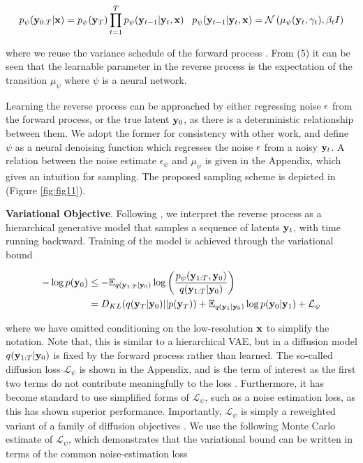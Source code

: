 \begin{equation}
p_{\psi}(\bold{y}_{0:T}\lvert\bold{x}) = p_{\psi}(\bold{y}_{T})\prod_{t=1}^{T} p_{\psi}(\bold{y}_{t-1}\lvert\bold{y}_{t},\bold{x}) \;\;\; p_{\psi}(\bold{y}_{t-1}\lvert\bold{y}_{t},\bold{x}) = \mathcal{N}\left(\mu_{\psi}(\bold{y}_{t},\gamma_{t}),\beta_{t}I\right)
\end{equation}

where we reuse the variance schedule of the forward process \parencite{Ho2020}. From (5) it can be seen that the learnable parameter in the reverse process is the expectation of the transition $\mu_{\psi}$ where $\psi$ is a neural network. 

Learning the reverse process can be approached by either regressing noise $\bold{\epsilon}$ from the forward process, or the true latent $\bold{y}_{0}$, as there is a deterministic relationship between them. We adopt the former for consistency with other work, and define $\psi$ as a neural denoising function which regresses the noise $\bold{\epsilon}$ from a noisy $\bold{y}_{t}$. A relation between the noise estimate $\epsilon_{\psi}$ and $\mu_{\psi}$ is given in the Appendix, which gives an intuition for sampling. The proposed sampling scheme is depicted in (Figure \ref{fig:fig11}). 

\textbf{Variational Objective}. Following \parencite{Kingma2021}, we interpret the reverse process as a hierarchical generative model that samples a sequence of latents $\bold{y}_{t}$, with time running backward. Training of the model is achieved through the variational bound

\begin{align}
-\log p(\bold{y}_{0}) &\leq -\mathbb{E}_{q(\bold{y}_{1:T}\lvert\bold{y}_{0})} \log \left(\frac{p_{\psi}(\bold{y}_{1:T},\bold{y}_{0})}{q(\bold{y}_{1:T}\lvert\bold{y}_{0})}\right) \\
&=  D_{KL}(q(\bold{y}_{T}\lvert\bold{y}_{0}) \lvert\lvert p(\bold{y}_{T})) + \mathbb{E}_{q(\bold{y}_{1}\lvert\bold{y}_{0})} \log p(\bold{y}_{0}\lvert\bold{y}_{1}) + \mathcal{L}_{\psi}
\end{align}

where we have omitted conditioning on the low-resolution $\bold{x}$ to simplify the notation. Note that, this is similar to a hierarchical VAE, but in a diffusion model $q(\bold{y}_{1:T}\lvert\bold{y}_{0})$ is fixed by the forward process rather than learned. The so-called diffusion loss $\mathcal{L}_{\psi}$ is shown in the Appendix, and is the term of interest as the first two terms do not contribute meaningfully to the loss \parencite{Ho2020}. Furthermore, it has become standard to use simplified forms of $\mathcal{L}_{\psi}$, such as a noise estimation loss, as this has shown superior performance. Importantly, $\mathcal{L}_{\psi}$ is simply a reweighted variant of a family of diffusion objectives \parencite{Kingma2021,Kingma2023}. We use the following Monte Carlo estimate of $\mathcal{L}_{\psi}$, which demonstrates that the variational bound can be written in terms of the common noise-estimation loss


